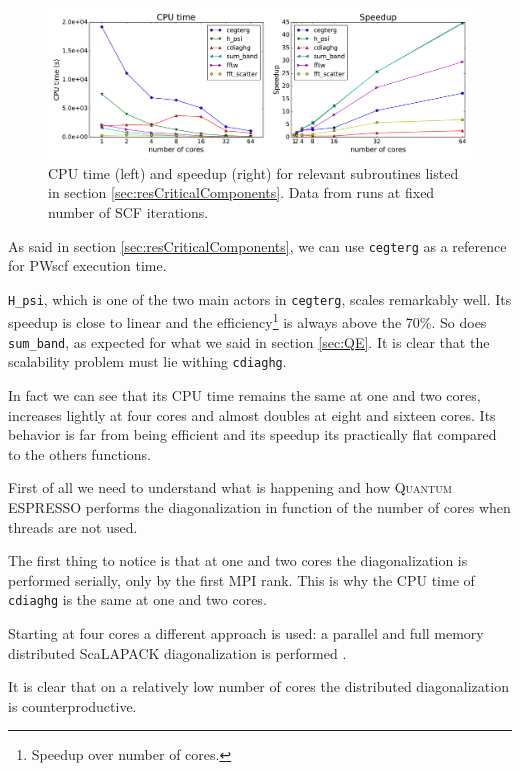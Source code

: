 \documentclass[a4paper,12pt]{article}
\newcommand\QE{\textsc{Quantum} ESPRESSO }
\begin{document}
\begin{figure}[hhh!]
\centerline{ \includegraphics[width=1.2\linewidth]{relevant_subroutines.pdf}	}
	\caption{CPU time (left) and speedup (right) for relevant subroutines listed in section \ref{sec:resCriticalComponents}. Data from runs at fixed number of SCF iterations.}
	\label{fig:relevantSubroutines}
\end{figure}

As said in section \ref{sec:resCriticalComponents}, we can use \texttt{cegterg}  as a reference for PWscf execution time.

\texttt{H\_psi}, which is one of the two main actors in \texttt{cegterg}, scales remarkably well. Its speedup is close to linear and the efficiency\footnote{Speedup over number of cores.} is always above the 70\%. 
So does \texttt{sum\_band}, as expected for what we said in section \ref{sec:QE}.
It is clear that the scalability problem must lie withing \texttt{cdiaghg}.

In fact we can see that its CPU time remains the same at one and two cores, increases lightly at four cores and almost doubles at eight and sixteen cores. 
Its behavior is far from being efficient and its speedup its practically flat compared to the others functions.

First of all we need to understand what is happening and how \QE performs the diagonalization in function of the number of cores when threads are not used.

The first thing to notice is that at one and two cores the diagonalization is performed serially, only by the first MPI rank. This is why the CPU time of \texttt{cdiaghg} is the same at one and two cores.

Starting at four cores a different approach is used: a parallel and full memory distributed ScaLAPACK diagonalization is performed \cite{QE2}.

%

It is clear that on a relatively low number of cores the distributed diagonalization is counterproductive.
\end{document}
